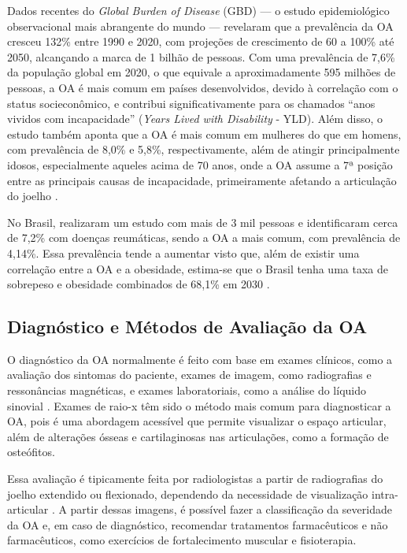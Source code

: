 Dados recentes do \textit{Global Burden of Disease} (GBD) — o estudo epidemiológico observacional mais abrangente do mundo — revelaram que a prevalência da OA cresceu 132\% entre 1990 e 2020, com projeções de crescimento de 60 a 100\% até 2050, alcançando a marca de 1 bilhão de pessoas. Com uma prevalência de 7,6\% da população global em 2020, o que equivale a aproximadamente 595 milhões de pessoas, a OA é mais comum em países desenvolvidos, devido à correlação com o status socieconômico, e contribui significativamente para os chamados ``anos vividos com incapacidade'' (\textit{Years Lived with Disability} - YLD). Além disso, o estudo também aponta que a OA é mais comum em mulheres do que em homens, com prevalência de 8,0\% e 5,8\%, respectivamente, além de atingir principalmente idosos, especialmente aqueles acima de 70 anos, onde a OA assume a 7ª posição entre as principais causas de incapacidade, primeiramente afetando a articulação do joelho \cite{COURTIES20241397}.

No Brasil,  realizaram um estudo com mais de 3 mil pessoas e identificaram cerca de 7,2\% com doenças reumáticas, sendo a OA a mais comum, com prevalência de 4,14\%. Essa prevalência tende a aumentar visto que, além de existir uma correlação entre a OA e a obesidade, estima-se que o Brasil tenha uma taxa de sobrepeso e obesidade combinados de 68,1\% em 2030 \cite{fiocruz2024}.

\subsection{Diagnóstico e Métodos de Avaliação da OA}

O diagnóstico da OA normalmente é feito com base em exames clínicos, como a avaliação dos sintomas do paciente, exames de imagem, como radiografias e ressonâncias magnéticas, e exames laboratoriais, como a análise do líquido sinovial \cite{Kraus2015}. Exames de raio-x têm sido o método mais comum para diagnosticar a OA, pois é uma abordagem acessível que permite visualizar o espaço articular, além de alterações ósseas e cartilaginosas nas articulações, como a formação de osteófitos.

Essa avaliação é tipicamente feita por radiologistas a partir de radiografias do joelho extendido ou flexionado, dependendo da necessidade de visualização intra-articular \cite{Braun2012}. A partir dessas imagens, é possível fazer a classificação da severidade da OA e, em caso de diagnóstico, recomendar tratamentos farmacêuticos e não farmacêuticos, como exercícios de fortalecimento muscular e fisioterapia.

